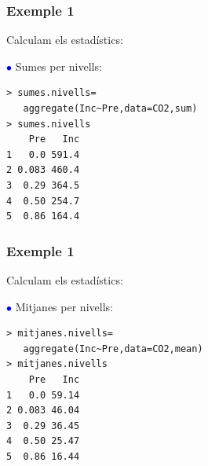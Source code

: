 \documentclass[12pt,t]{beamer}
\newcommand{\blue}[1]{\textcolor{blue}{#1}}
\theoremstyle{plain}
\theoremstyle{definition}
\begin{document}
\begin{frame}[fragile]
\frametitle{Exemple 1}
\vspace*{-2ex}

Calculam els estadístics:\medskip

\blue{$\mathbf \bullet$} Sumes per nivells:

\begin{verbatim}
> sumes.nivells=
   aggregate(Inc~Pre,data=CO2,sum)
> sumes.nivells
    Pre   Inc
1   0.0 591.4
2 0.083 460.4
3  0.29 364.5
4  0.50 254.7
5  0.86 164.4
\end{verbatim}
\end{frame}



\begin{frame}[fragile]
\frametitle{Exemple 1}
Calculam els estadístics:\medskip

\blue{$\mathbf \bullet$} Mitjanes per nivells:

\begin{verbatim}
> mitjanes.nivells=
   aggregate(Inc~Pre,data=CO2,mean)
> mitjanes.nivells
    Pre   Inc
1   0.0 59.14
2 0.083 46.04
3  0.29 36.45
4  0.50 25.47
5  0.86 16.44
\end{verbatim}

\end{frame}
\end{document}
